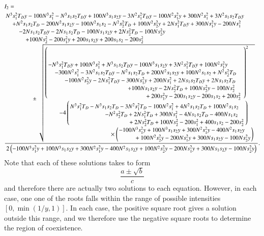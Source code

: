 \documentclass[a4paper]{article}
\begin{document}
   \begin{align}
   &I_2=\\
   & \frac{ \splitfrac{N^3 s_1^2 T_D y- 100 N^3 s_1^2- N^3 s_1 s_2 T_D y+ 100 N^3 s_1 s_2 y- 3 N^2
   s_1^2 T_D y -100 N^2 s_1^2 y+ 300 N^2 s_1^2+ 3 N^2 s_1 s_2 T_D y }{ \splitfrac{+N^2 s_1 s_2
   T_D-200 N^2 s_1 s_2 y- 100 N^2 s_1 s_2- N^2 s_2^2 T_D+ 100 N^2 s_2^2
   y+ 2 N s_1^2 T_D
   y+ 300 N s_1^2 y- 200 N s_1^2}{\splitfrac{-2N s_1 s_2 T_D y - 2 N s_1 s_2 T_D- 100 N s_1
   s_2 y+ 2 N s_2^2 T_D- 100 N s_2^2 y}{\splitfrac{+ 100 N s_2^2- 200 s_1^2 y+ 200 s_1 s_2
   y +200 s_1 s_2-200 s_2^2}{ \pm \sqrt{\splitfrac{ \left( \splitfrac{-N^3 s_1^2 T_D y+100 N^3 s_1^2+N^3 s_1 s_2 T_D y-100 N^3 s_1 s_2
   y+3 N^2 s_1^2 T_D y+100 N^2 s_1^2 y}{\splitfrac{-300 N^2 s_1^2-3 N^2 s_1 s_2 T_D y- N^2 s_1
   s_2 T_D+ 200 N^2 s_1 s_2 y+ 100 N^2 s_1 s_2+ N^2 s_2^2 T_D}{\splitfrac{- 100 N^2 s_2^2 y- 2
   N s_1^2 T_D y-300 N s_1^2 y+200 N s_1^2+2 N s_1 s_2 T_D y+2 N s_1 s_2
   T_D}{\splitfrac{+100 N s_1 s_2 y-2 N s_2^2 T_D+100 N s_2^2 y-100 N s_2^2}{+200 s_1^2 y-200
   s_1 s_2 y-200 s_1 s_2+200 s_2^2}}}}\right)^2}{\splitfrac{-4 \left(\splitfrac{N^3 s_1^2 T_D-N^3 s_1
   s_2 T_D-3 N^2 s_1^2 T_D-100 N^2 s_1^2+4 N^2 s_1 s_2 T_D+100 N^2 s_1 s_2}{\splitfrac{-N^2
   s_2^2 T_D+2 N s_1^2 T_D+300 N s_1^2-4 N s_1 s_2 T_D-400 N s_1 s_2}{+2 N
   s_2^2 T_D+100 N s_2^2-200 s_1^2+400 s_1 s_2-200 s_2^2}}\right)}{ \times \left(\splitfrac{-100 N^3
   s_1^2 y+100 N^3 s_1 s_2 y+300 N^2 s_1^2 y-400 N^2 s_1 s_2 y}{+100 N^2
   s_2^2 y-200 N s_1^2 y+300 N s_1 s_2 y-100 N s_2^2 y}\right)}}}}}}}}
   {2 \left(-100 N^3 s_1^2 y+100 N^3 s_1 s_2 y+300 N^2
   s_1^2 y-400 N^2 s_1 s_2 y+100 N^2 s_2^2 y-200 N s_1^2 y+300 N s_1 s_2
   y-100 N s_2^2 y\right)}.   \notag
   \end{align}
   Note that each of these solutions takes to form
   $$
  \frac{ a\pm \sqrt{b}}{c}
  $$
  and therefore there are actually two solutions to each equation. However, in each case, one one of the roots falls within the range of possible intensities $[0,\min(1/y,1)]$. In each case, the positive square root gives a solution outside this range, and we therefore use the negative square roots to determine the region of coexistence.
   
\end{document}
